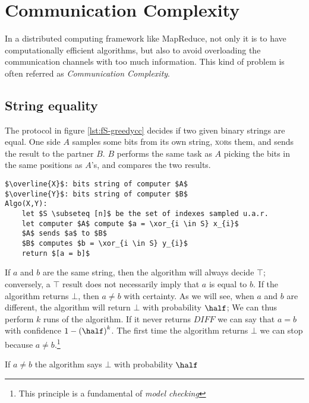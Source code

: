 \chapter{Communication Complexity}

In a distributed computing framework like MapReduce, not only it is to have computationally efficient algorithms, but also to avoid overloading the communication channels with too much information. This kind of problem is often referred as \emph{Communication Complexity}.

\section{String equality}
The protocol in figure \ref{lst:fS-greedycc} decides if two given binary strings are equal. One side $A$ samples some bits from its own string, \textsc{xor}s them, and sends the result to the partner $B$. $B$ performs the same task as $A$ picking the bits in the same positions as $A$'s, and compares the two results.
\begin{lstlisting}[caption={Greedy algorithm},label={lst:fS-greedycc}]
$\overline{X}$: bits string of computer $A$
$\overline{Y}$: bits string of computer $B$
Algo(X,Y):
    let $S \subseteq [n]$ be the set of indexes sampled u.a.r.
    let computer $A$ compute $a = \xor_{i \in S} x_{i}$
    $A$ sends $a$ to $B$
    $B$ computes $b = \xor_{i \in S} y_{i}$
    return $[a = b]$
\end{lstlisting}

If $a$ and $b$ are the same string, then the algorithm will always decide $\top$; conversely, a $\top$ result does not necessarily imply that $a$ is equal to $b$. If the algorithm returns $\bot$, then $a \neq b$ with certainty. As we will see, when $a$ and $b$ are different, the algorithm will return $\bot$ with probability $\half$;
We can thus perform $k$ runs of the algorithm. If it never returns $DIFF$ we can say that $a = b$ with confidence $1 - \left( \half \right)^k$. The first time the algorithm returns $\bot$ we can stop because $a \neq b$.\footnote{This principle is a fundamental of \emph{model checking}}

\begin{theorem}
    If $a \neq b$ the algorithm says $\bot$ with probability $\half$
\end{theorem}

